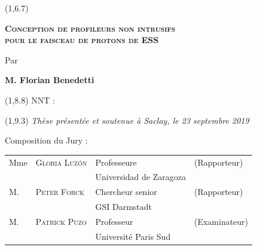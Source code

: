 \begin{titlepage}
  \begin{textblock}{14}(1,6.7)
    \begin{center}	
      \Large \textsc{\textcolor{ESSColor}{ \textbf{Conception de profileurs non intrusifs \\pour le faisceau de protons de ESS}}}\par
      \large Par\par  \large \textbf{M. Florian Benedetti} \par
    \end{center}
  \end{textblock}
  
  \begin{textblock}{13}(1,8.8)
    NNT : 
  \end{textblock}
  
  \begin{textblock}{14}(1,9.3)
    \vspace{1.5cm}
    \hspace{1cm}\textit{Thèse présentée et soutenue à Saclay, le 23 septembre 2019}
    \vspace{0.5cm}
    \par
    \hspace{1cm}Composition du Jury :
    \begin{center}
      \begin{tabular}{llll}        
        Mme   & \textsc{Gloria Luz\'{o}n}        & Professeure             & (Rapporteur)           \\
        \null & \null                        & Universidad de Zaragoza &                        \\ 
        
        M.    & \textsc{Peter Forck}          & Chercheur senior        & (Rapporteur)           \\
        \null & \null                        & GSI Darmstadt           &                        \\ 
        M.    & \textsc{Patrick Puzo}        & Professeur              & (Examinateur)    \\
        \null & \null                        & Université Paris Sud    &                        \\   


\end{tabular}
\end{center}
\end{textblock}
\end{titlepage}
